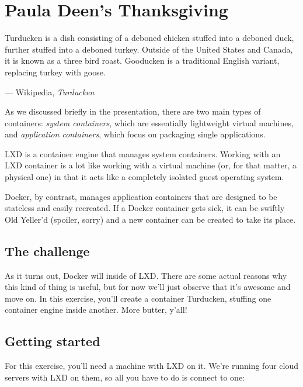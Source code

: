\chapter*{Paula Deen's Thanksgiving}

\begin{quoting}
  Turducken is a dish consisting of a deboned chicken stuffed into a deboned duck, further stuffed into a deboned turkey. Outside of the United States and Canada, it is known as a three bird roast. Gooducken is a traditional English variant, replacing turkey with goose.

  \begin{flushright}
    --- Wikipedia, \textit{Turducken}
  \end{flushright}
\end{quoting}

\vspace{2em}

As we discussed briefly in the presentation, there are two main types of containers: \textit{system containers}, which are essentially lightweight virtual machines, and \textit{application containers}, which focus on packaging single applications.

LXD is a container engine that manages system containers. Working with an LXD container is a lot like working with a virtual machine (or, for that matter, a physical one) in that it acts like a completely isolated guest operating system.

Docker, by contrast, manages application containers that are designed to be stateless and easily recreated. If a Docker container gets sick, it can be swiftly Old Yeller'd (spoiler, sorry) and a new container can be created to take its place.

\section*{The challenge}

As it turns out, Docker will inside of LXD. There are some actual reasons why this kind of thing is useful, but for now we'll just observe that it's awesome and move on. In this exercise, you'll create a container Turducken, stuffing one container engine inside another. More butter, y'all!

\section*{Getting started}

For this exercise, you'll need a machine with LXD on it. We're running four cloud servers with LXD on them, so all you have to do is connect to one:

